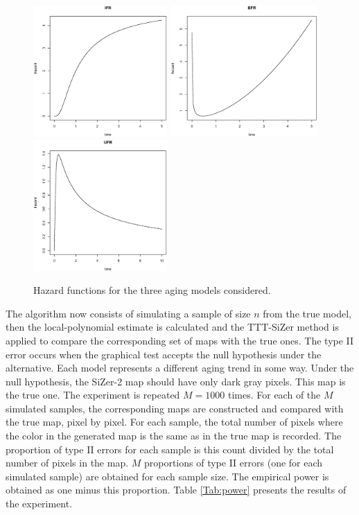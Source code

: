 \documentclass[preprint,12pt]{elsarticle}
\begin{document}
\begin{figure}[h]\centering
        \includegraphics[height=5cm]{Fig7_1_IFRmodel}%
				\includegraphics[height=5cm]{Fig7_2_BFRmodel}%
				\includegraphics[height=5cm]{Fig7_3_UFRmodel}%
\caption{{Hazard functions for the three aging models considered}.} \label{models}
\end{figure}

The algorithm now consists of simulating a sample of size $n$ from the true model, then  the local-polynomial estimate is calculated and the TTT-SiZer method is applied to compare the corresponding set of maps with the true ones.
The type II error occurs when the graphical test accepts the null hypothesis under the alternative. Each model represents a different  aging trend in some way. Under the null  hypothesis, the SiZer-2 map  should have only dark gray pixels. This map is the true one. The experiment is repeated $M=1000$ times.  For each of the $M$ simulated samples,  the corresponding maps are constructed and compared with the true map, pixel by pixel. For each sample, the total number of pixels where the color in the generated map is  the same as in the true map is recorded. The proportion of type II errors for each sample is this count divided by the total number of pixels in the map. $M$ proportions of type II errors (one for each simulated sample) are obtained for each sample size. The empirical power is obtained as one minus this proportion. Table \ref{Tab:power} presents the results of the experiment.
\end{document}
